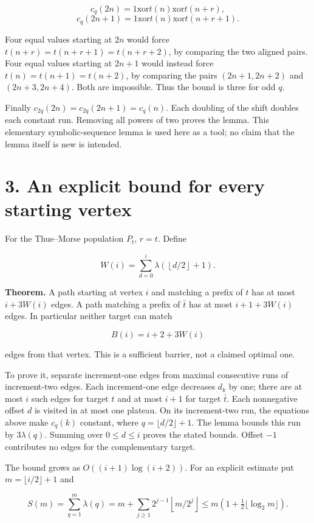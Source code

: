 \documentclass[
  11pt,
]{article}
\begin{document}
\[c_q(2n)=1\mathbin{\mathrm{xor}}t(n)\mathbin{\mathrm{xor}}t(n+r),\]
\[c_q(2n+1)=1\mathbin{\mathrm{xor}}t(n)\mathbin{\mathrm{xor}}t(n+r+1).\]

Four equal values starting at \(2n\) would force
\(t(n+r)=t(n+r+1)=t(n+r+2)\), by comparing the two aligned pairs. Four
equal values starting at \(2n+1\) would instead force
\(t(n)=t(n+1)=t(n+2)\), by comparing the pairs \((2n+1,2n+2)\) and
\((2n+3,2n+4)\). Both are impossible. Thus the bound is three for odd
\(q\).

Finally \(c_{2q}(2n)=c_{2q}(2n+1)=c_q(n)\). Each doubling of the shift
doubles each constant run. Removing all powers of two proves the lemma.
This elementary symbolic-sequence lemma is used here as a tool; no claim
that the lemma itself is new is intended.

\section{3. An explicit bound for every starting
vertex}\label{an-explicit-bound-for-every-starting-vertex}

For the Thue--Morse population \(P_t\), \(r=t\). Define

\[W(i)=\sum_{d=0}^{i}\lambda\!\left(\left\lfloor d/2\right\rfloor+1\right).\]

\textbf{Theorem.} A path starting at vertex \(i\) and matching a prefix
of \(t\) has at most \(i+3W(i)\) edges. A path matching a prefix of
\(\bar t\) has at most \(i+1+3W(i)\) edges. In particular neither target
can match

\[B(i)=i+2+3W(i)\]

edges from that vertex. This is a sufficient barrier, not a claimed
optimal one.

To prove it, separate increment-one edges from maximal consecutive runs
of increment-two edges. Each increment-one edge decreases \(d_k\) by
one; there are at most \(i\) such edges for target \(t\) and at most
\(i+1\) for target \(\bar t\). Each nonnegative offset \(d\) is visited
in at most one plateau. On its increment-two run, the equations above
make \(c_q(k)\) constant, where \(q=\lfloor d/2\rfloor+1\). The lemma
bounds this run by \(3\lambda(q)\). Summing over \(0\le d\le i\) proves
the stated bounds. Offset \(-1\) contributes no edges for the
complementary target.

The bound grows as \(O((i+1)\log(i+2))\). For an explicit estimate put
\(m=\lfloor i/2\rfloor+1\) and

\[S(m)=\sum_{q=1}^{m}\lambda(q)
=m+\sum_{j\ge1}2^{j-1}\left\lfloor m/2^j\right\rfloor
\le m\left(1+\tfrac12\lfloor\log_2m\rfloor\right).\]
\end{document}
